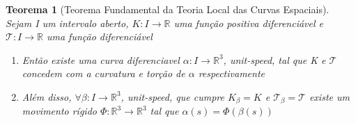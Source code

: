 \documentclass{article}
\newtheorem{theorem}{Teorema}
\begin{document}
\begin{theorem}[Teorema Fundamental da Teoria Local das Curvas Espaciais]
Sejam I um intervalo aberto, $K: I \rightarrow \mathbb{R}$ uma função positiva diferenciável e $\mathcal{T}: I \rightarrow \mathbb{R}$ uma função diferenciável

\begin{enumerate}
    \item Então existe uma curva diferenciavel $\alpha: I \rightarrow \mathbb{R}^3$, unit-speed, tal que K e $\mathcal{T}$ concedem com a curvatura e torção de $\alpha$ respectivamente
    
    \item Além disso, $\forall \beta: I \rightarrow \mathbb{R}^3$, unit-speed, que cumpre $K_\beta = K$ e $\mathcal{T}_\beta = \mathcal{T}$ existe um movimento rígido $\Phi: \mathbb{R}^3 \rightarrow \mathbb{R}^3$ tal que $\alpha(s) = \Phi(\beta(s))$ 
\end{enumerate}
\end{theorem}
\end{document}
